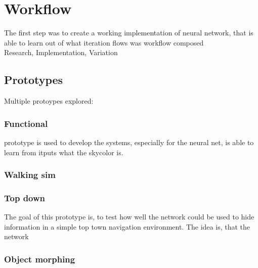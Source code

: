 
\chapter{Workflow}
The first step was to create a working implementation of neural network, that is able to learn
out of what iteration flows was workflow composed \\
Research, Implementation, Variation


\section{Prototypes}
Multiple protoypes explored:


\subsection{Functional}
prototype is used to develop the systems, especially for the neural net,
is able to learn from itputs what the skycolor is.



\subsection{Walking sim}


\subsection{Top down}
The goal of this prototype is, to test how well the network could be used to hide information in a simple top town navigation environment.
The idea is, that the network



\subsection{Object morphing}

